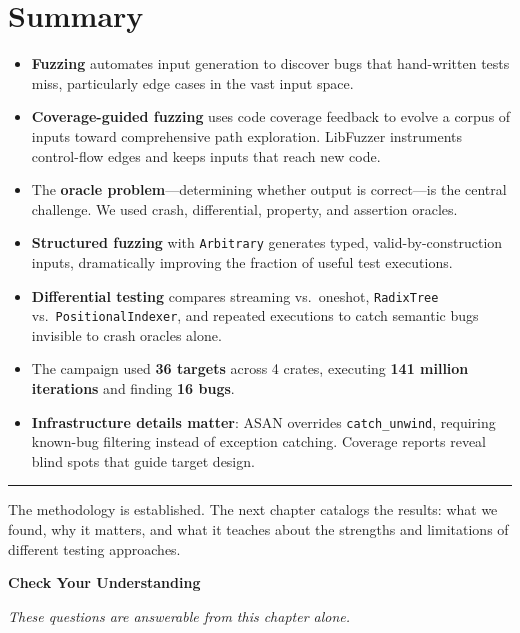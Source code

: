 \section{Summary}

\begin{itemize}
  \item \textbf{Fuzzing} automates input generation to discover bugs that hand-written tests miss, particularly edge cases in the vast input space.
  \item \textbf{Coverage-guided fuzzing} uses code coverage feedback to evolve a corpus of inputs toward comprehensive path exploration. LibFuzzer instruments control-flow edges and keeps inputs that reach new code.
  \item The \textbf{oracle problem}---determining whether output is correct---is the central challenge. We used crash, differential, property, and assertion oracles.
  \item \textbf{Structured fuzzing} with \texttt{Arbitrary} generates typed, valid-by-construction inputs, dramatically improving the fraction of useful test executions.
  \item \textbf{Differential testing} compares streaming vs.\ oneshot, \texttt{RadixTree} vs.\ \texttt{PositionalIndexer}, and repeated executions to catch semantic bugs invisible to crash oracles alone.
  \item The campaign used \textbf{36 targets} across 4 crates, executing \textbf{141 million iterations} and finding \textbf{16 bugs}.
  \item \textbf{Infrastructure details matter}: ASAN overrides \texttt{catch\_unwind}, requiring known-bug filtering instead of exception catching. Coverage reports reveal blind spots that guide target design.
\end{itemize}

\medskip
\begin{center}\rule{0.5\linewidth}{0.4pt}\end{center}
\medskip

The methodology is established. The next chapter catalogs the results: what we found, why it matters, and what it teaches about the strengths and limitations of different testing approaches.

\medskip
\noindent\textbf{Check Your Understanding}

\smallskip
\noindent\emph{These questions are answerable from this chapter alone.}

